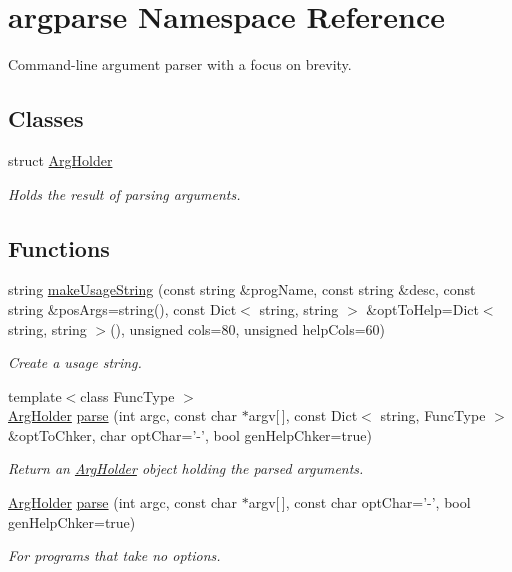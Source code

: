 \hypertarget{namespaceargparse}{\section{argparse Namespace Reference}
\label{namespaceargparse}
}


Command-\/line argument parser with a focus on brevity.  


\subsection*{Classes}
\begin{DoxyCompactItemize}
\item 
struct \hyperlink{structargparse_1_1_arg_holder}{Arg\-Holder}
\begin{DoxyCompactList}\small\item\em Holds the result of parsing arguments. \end{DoxyCompactList}\end{DoxyCompactItemize}
\subsection*{Functions}
\begin{DoxyCompactItemize}
\item 
string \hyperlink{namespaceargparse_a336ebbf4216b617d79a43d8211600118}{make\-Usage\-String} (const string \&prog\-Name, const string \&desc, const string \&pos\-Args=string(), const Dict$<$ string, string $>$ \&opt\-To\-Help=Dict$<$ string, string $>$(), unsigned cols=80, unsigned help\-Cols=60)
\begin{DoxyCompactList}\small\item\em Create a usage string. \end{DoxyCompactList}\item 
{\footnotesize template$<$class Func\-Type $>$ }\\\hyperlink{structargparse_1_1_arg_holder}{Arg\-Holder} \hyperlink{namespaceargparse_a6a82e35cb0ec90fbe4a17db4ae3539d4}{parse} (int argc, const char $\ast$argv\mbox{[}$\,$\mbox{]}, const Dict$<$ string, Func\-Type $>$ \&opt\-To\-Chker, char opt\-Char='-\/', bool gen\-Help\-Chker=true)
\begin{DoxyCompactList}\small\item\em Return an \hyperlink{structargparse_1_1_arg_holder}{Arg\-Holder} object holding the parsed arguments. \end{DoxyCompactList}\item 
\hyperlink{structargparse_1_1_arg_holder}{Arg\-Holder} \hyperlink{namespaceargparse_a6cfba06102a610840779069dfda1b98d}{parse} (int argc, const char $\ast$argv\mbox{[}$\,$\mbox{]}, const char opt\-Char='-\/', bool gen\-Help\-Chker=true)
\begin{DoxyCompactList}\small\item\em For programs that take no options. \end{DoxyCompactList}\end{DoxyCompactItemize}


